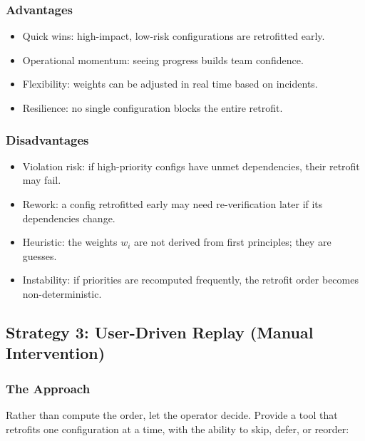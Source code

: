 \subsubsection{Advantages}

\begin{itemize}
  \item Quick wins: high-impact, low-risk configurations are retrofitted early.
  \item Operational momentum: seeing progress builds team confidence.
  \item Flexibility: weights can be adjusted in real time based on incidents.
  \item Resilience: no single configuration blocks the entire retrofit.
\end{itemize}

\subsubsection{Disadvantages}

\begin{itemize}
  \item Violation risk: if high-priority configs have unmet dependencies, their retrofit may fail.
  \item Rework: a config retrofitted early may need re-verification later if its dependencies change.
  \item Heuristic: the weights $w_i$ are not derived from first principles; they are guesses.
  \item Instability: if priorities are recomputed frequently, the retrofit order becomes non-deterministic.
\end{itemize}

\subsection{Strategy 3: User-Driven Replay (Manual Intervention)}

\subsubsection{The Approach}

Rather than compute the order, let the operator decide. Provide a tool that retrofits one configuration at a time, with the ability to skip, defer, or reorder:

